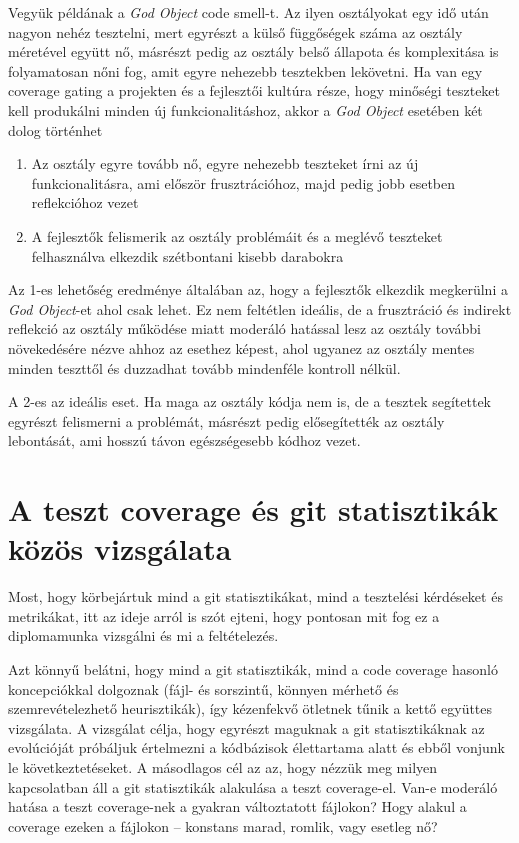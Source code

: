 Vegyük példának a \textit{God Object} code smell-t. Az ilyen osztályokat egy idő után nagyon nehéz tesztelni, mert egyrészt a külső függőségek száma az osztály méretével együtt nő, másrészt pedig az osztály belső állapota és komplexitása is folyamatosan nőni fog, amit egyre nehezebb tesztekben lekövetni. Ha van egy coverage gating a projekten és a fejlesztői kultúra része, hogy minőségi teszteket kell produkálni minden új funkcionalitáshoz, akkor a \textit{God Object} esetében két dolog történhet

\begin{enumerate}
    \item Az osztály egyre tovább nő, egyre nehezebb teszteket írni az új funkcionalitásra, ami először frusztrációhoz, majd pedig jobb esetben reflekcióhoz vezet
    \item A fejlesztők felismerik az osztály problémáit és a meglévő teszteket felhasználva elkezdik szétbontani kisebb darabokra
\end{enumerate}

Az 1-es lehetőség eredménye általában az, hogy a fejlesztők elkezdik megkerülni a \textit{God Object}-et ahol csak lehet. Ez nem feltétlen ideális, de a frusztráció és indirekt reflekció az osztály működése miatt moderáló hatással lesz az osztály további növekedésére nézve ahhoz az esethez képest, ahol ugyanez az osztály mentes minden teszttől és duzzadhat tovább mindenféle kontroll nélkül.

A 2-es az ideális eset. Ha maga az osztály kódja nem is, de a tesztek segítettek egyrészt felismerni a problémát, másrészt pedig elősegítették az osztály lebontását, ami hosszú távon egészségesebb kódhoz vezet.

\section{A teszt coverage és git statisztikák közös vizsgálata}

Most, hogy körbejártuk mind a git statisztikákat, mind a tesztelési kérdéseket és metrikákat, itt az ideje arról is szót ejteni, hogy pontosan mit fog ez a diplomamunka vizsgálni és mi a feltételezés.

Azt könnyű belátni, hogy mind a git statisztikák, mind a code coverage hasonló koncepciókkal dolgoznak (fájl- és sorszintű, könnyen mérhető és szemrevételezhető heurisztikák), így kézenfekvő ötletnek tűnik a kettő együttes vizsgálata. A vizsgálat célja, hogy egyrészt maguknak a git statisztikáknak az evolúcióját próbáljuk értelmezni a kódbázisok élettartama alatt és ebből vonjunk le következtetéseket. A másodlagos cél az az, hogy nézzük meg milyen kapcsolatban áll a git statisztikák alakulása a teszt coverage-el. Van-e moderáló hatása a teszt coverage-nek a gyakran változtatott fájlokon? Hogy alakul a coverage ezeken a fájlokon -- konstans marad, romlik, vagy esetleg nő?

